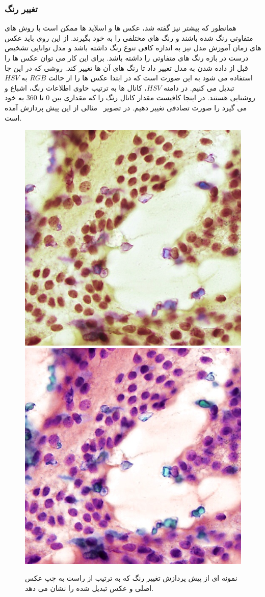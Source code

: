 \subsubsection{تغییر رنگ}
همانطور که پیشتر نیز گفته شد، عکس ها و اسلاید ها ممکن است با روش های متفاوتی رنگ شده باشند و رنگ های مختلفی را به خود بگیرند.
از این روی باید عکس های زمان آموزش مدل نیز به اندازه کافی تنوع رنگ داشته باشد و مدل توانایی تشخیص درست در بازه رنگ های متفاوتی را داشته باشد.
برای این کار می توان عکس ها را قبل از داده شدن به مدل تغییر داد تا رنگ های آن ها تغییر کند.
روشی که در این جا استفاده می شود به این صورت است که در ابتدا عکس ها را از حالت $RGB$ به $HSV$ تبدیل می کنیم.
در دامنه $HSV$، کانال ها به ترتیب حاوی اطلاعات رنگ، اشباع و روشنایی هستند.
در اینجا کافیست مقدار کانال رنگ را که مقداری بین 0 تا 360 به خود می گیرد را صورت تصادفی تغییر دهیم.
در تصویر~ مثالی از این پیش پردازش آمده است.
\begin{figure}
    \begin{center}
        \includegraphics[width=0.48\linewidth]{figs/suggested_methods/subs/data_augmentation/jitter_1054-original.jpeg}
        \includegraphics[width=0.48\linewidth]{figs/suggested_methods/subs/data_augmentation/jitter_1054-transformed.jpeg}
    \end{center}
    \caption{نمونه ای از پیش پردازش تغییر رنگ که به ترتیب از راست به چپ عکس اصلی و عکس تبدیل شده را نشان می دهد.}
    \label{شکل: jitter augmentation}
\end{figure}

